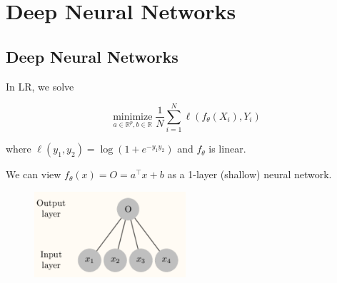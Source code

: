 \documentclass{report}
\begin{document}
\chapter{Deep Neural Networks}

\section{Deep Neural Networks}

\begin{concept}
    In LR, we solve

    $$
    \underset{a \in \mathbb{R}^{p}, b \in \mathbb{R}}{\operatorname{minimize}} \frac{1}{N} \sum_{i=1}^{N} \ell\left(f_{\theta}\left(X_{i}\right), Y_{i}\right)
    $$

    where $\ell\left(y_{1}, y_{2}\right)=\log \left(1+e^{-y_{1} y_{2}}\right)$ and $f_{\theta}$ is linear.

    We can view $f_{\theta}(x)=O=a^{\top} x+b$ as a 1-layer (shallow) neural network.

    \begin{figure}[H]
        \centering
        \includegraphics[width=0.5\textwidth]{.././assets/4.1.png}
    \end{figure}
\end{concept}
\end{document}
